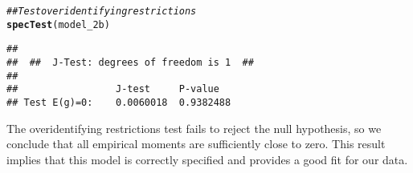 \documentclass[11pt,letterpaper]{article}\usepackage[]{graphicx}\usepackage[]{xcolor}
\makeatletter
\newcommand{\hlcom}[1]{\textcolor[rgb]{0.678,0.584,0.686}{\textit{#1}}}%
\newcommand{\hlstd}[1]{\textcolor[rgb]{0.345,0.345,0.345}{#1}}%
\newcommand{\hlkwd}[1]{\textcolor[rgb]{0.737,0.353,0.396}{\textbf{#1}}}%
\newenvironment{kframe}{%
 \def\at@end@of@kframe{}%
 \ifinner\ifhmode%
  \def\at@end@of@kframe{\end{minipage}}%
  \begin{minipage}{\columnwidth}%
 \fi\fi%
 \def\FrameCommand##1{\hskip\@totalleftmargin \hskip-\fboxsep
 \colorbox{shadecolor}{##1}\hskip-\fboxsep
     \hskip-\linewidth \hskip-\@totalleftmargin \hskip\columnwidth}%
 \MakeFramed {\advance\hsize-\width
   \@totalleftmargin\z@ \linewidth\hsize
   \@setminipage}}%
 {\par\unskip\endMakeFramed%
 \at@end@of@kframe}
\newenvironment{knitrout}{}{} %
\makeatother
\begin{document}
\begin{enumerate}[label=\alph*., leftmargin=*]
\begin{enumerate}[label=\roman*.]
\begin{knitrout}
\color{fgcolor}\begin{kframe}
\begin{alltt}
\hlcom{## Test overidentifying restrictions}
\hlkwd{specTest}\hlstd{(model_2b)}
\end{alltt}
\begin{verbatim}
## 
##  ##  J-Test: degrees of freedom is 1  ## 
## 
##                 J-test     P-value  
## Test E(g)=0:    0.0060018  0.9382488
\end{verbatim}
\end{kframe}
\end{knitrout}

		The overidentifying restrictions test fails to reject the null hypothesis, so we conclude that all empirical moments are sufficiently close to zero. This result implies that this model is correctly specified and provides a good fit for our data.
	\end{enumerate}
\end{enumerate}
\end{document}
